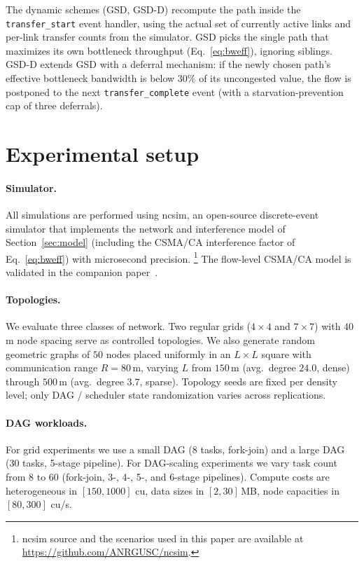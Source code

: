 \documentclass[conference]{IEEEtran}
\begin{document}
The dynamic schemes (GSD, GSD-D) recompute the path inside the
\texttt{transfer\_start} event handler, using the actual set of currently
active links and per-link transfer counts from the simulator. GSD picks the
single path that maximizes its own bottleneck throughput
(Eq.~\ref{eq:bweff}), ignoring siblings. GSD-D extends GSD with a deferral
mechanism: if the newly chosen path's effective bottleneck bandwidth is below
30\% of its uncongested value, the flow is postponed to the next
\texttt{transfer\_complete} event (with a starvation-prevention cap of
three deferrals).

\section{Experimental setup}
\label{sec:setup}

\paragraph{Simulator.} All simulations are performed using ncsim, an
open-source discrete-event simulator that implements the network and
interference model of Section~\ref{sec:model} (including the CSMA/CA
interference factor of Eq.~\eqref{eq:bweff}) with microsecond precision.
\footnote{ncsim source and the scenarios used in this paper are available at
\url{https://github.com/ANRGUSC/ncsim}.} The flow-level CSMA/CA model
is validated in the companion paper~\cite{krishnamachari2026ncsim}.

\paragraph{Topologies.} We evaluate three classes of network. Two regular
grids ($4\times4$ and $7\times7$) with $40$\,m node spacing serve as
controlled topologies. We also generate random geometric graphs of
$50$ nodes placed uniformly in an $L\times L$ square with communication range
$R=80$\,m, varying $L$ from $150$\,m (avg.\ degree $24.0$, dense) through
$500$\,m (avg.\ degree $3.7$, sparse). Topology seeds are fixed per density
level; only DAG / scheduler state randomization varies across replications.

\paragraph{DAG workloads.} For grid experiments we use a small DAG (8 tasks,
fork-join) and a large DAG (30 tasks, 5-stage pipeline). For DAG-scaling
experiments we vary task count from 8 to 60 (fork-join, 3-, 4-, 5-, and
6-stage pipelines). Compute costs are heterogeneous in $[150,1000]$ cu, data
sizes in $[2,30]$\,MB, node capacities in $[80,300]$ cu/s.
\end{document}
